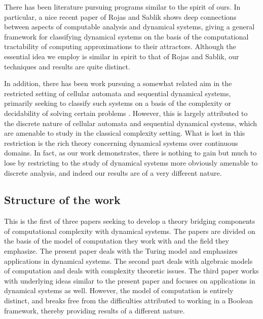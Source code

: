 \documentclass{amsart}
\theoremstyle{theorem}
\theoremstyle{remark}
\numberwithin{equation}{section}
\begin{document}
There has been literature pursuing programs similar to the spirit of ours. In particular, a nice recent paper of Rojas and Sablik \cite{rojas2025algorithmic} shows deep connections between aspects of computable analysis and dynamical systems, giving a general framework for classifying dynamical systems on the basis of the computational tractability of computing approximations to their attractors. Although the essential idea we employ is similar in spirit to that of Rojas and Sablik, our techniques and results are quite distinct.

In addition, there has been work pursuing a somewhat related aim in the restricted setting of cellular automata and sequential dynamical systems, primarily seeking to classify such systems on a basis of the complexity or decidability of solving certain problems \cite{barrett2006complexity,applebaum2010cryptography,buss1990predictability,SutnerComplexityOfCA,sutner1995computational,sutner2012computational}.
However, this is largely attributed to the discrete nature of cellular automata and sequential dynamical systems, which are amenable to study in the classical complexity setting.
What is lost in this restriction is the rich theory concerning dynamical systems over continuous domains.
In fact, as our work demonstrates, there is nothing to gain but much to lose by restricting to the study of dynamical systems more obviously amenable to discrete analysis, and indeed our results are of a very different nature.





\subsection{Structure of the work}
This is the first of three papers seeking to develop a theory bridging components of computational complexity with dynamical systems. The papers are divided on the basis of the model of computation they work with and the field they emphasize. The present paper deals with the Turing model and emphasizes applications in dynamical systems. The second part \cite{everett2} deals with algebraic models of computation and deals with complexity theoretic issues. The third paper \cite{everett3} works with underlying ideas similar to the present paper and focuses on applications in dynamical systems as well. However, the model of computation is entirely distinct, and breaks free from the difficulties attributed to working in a Boolean framework, thereby providing results of a different nature.
\end{document}
